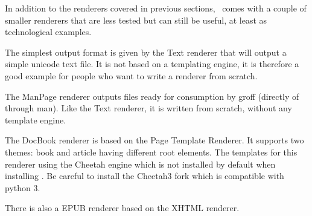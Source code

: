 In addition to the renderers covered in previous sections, \plasTeX\
comes with a couple of smaller renderers that are less tested but can
still be useful, at least as technological examples.

The simplest output format is given by the Text renderer that will
output a simple unicode text file. It is not based on a templating
engine, it is therefore a good example for people who want to write
a renderer from scratch.

The ManPage renderer outputs files ready for consumption by groff
(directly of through man). Like the Text renderer, it is written
from scratch, without any template engine.

The DocBook renderer is based on the Page Template Renderer.
It supports two themes: book and article having different root elements.
The templates for this renderer using the Cheetah engine which is not
installed by default when installing \plasTeX. Be careful to install
the Cheetah3 fork which is compatible with python 3.

There is also a EPUB renderer based on the XHTML renderer.

